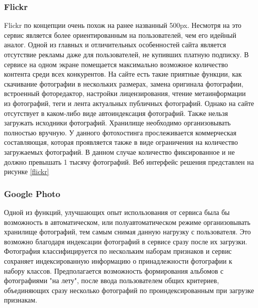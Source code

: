 
\subsubsection{Flickr}
Flickr по концепции очень похож на ранее названный 500px.
Несмотря на это сервис является более ориентированным на пользователей, чем его идейный аналог.
Одной из главных и отличительных особенностей сайта является отсутствие рекламы даже для пользователей, не купивших платную подписку. 
В сервисе на одном экране помещается максимально возможное количество контента среди всех конкурентов.
На сайте есть такие приятные функции, как скачивание фотографии в нескольких размерах, замена оригинала фотографии, встроенный фоторедактор, настройки лицензирования, чтение метаинформации из фотографий, теги и лента актуальных публичных фотографий.
Однако на сайте отсутствует в каком-либо виде автоиндексация фотографий.
Также нельзя загружать исходники фотографий.
Хранилище необходимо организовывать полностью вручную.
У данного фотохостинга прослеживается коммерческая составляющая, которая проявляется также в виде ограничения на количество загружаемых фотографий.
В данном случае количество фиксированное и не должно превышать 1 тысячу фотографий.
Веб интерфейс решения представлен на рисунке \ref{flickr}


\subsubsection{Google Photo}

Одной из функций, улучшающих опыт использования от сервиса была бы возможность в автоматическом, или полуавтоматическом режиме организовывать хранилище фотографий, тем самым снимая данную нагрузку с пользователя.
Это возможно благодаря индексации фотографий в сервисе сразу после их загрузки. 
Фотография классифицируется по нескольким наборам признаков и сервис сохраняет индексированную информацию о принадлежности фотографии к набору классов.
Предполагается возможность формирования альбомов с фотографиями "на лету", после ввода пользователем общих критериев, объединяющих сразу несколько фотографий по проиндексированным при загрузке признакам.

